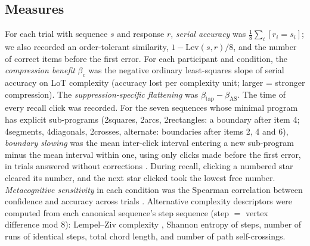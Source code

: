 \documentclass[11pt,a4paper]{article}
\begin{document}
\subsection{Measures}
For each trial with sequence $s$ and response $r$, \emph{serial accuracy} was $\frac{1}{8}\sum_{i} [r_i = s_i]$; we also
recorded an order-tolerant similarity, $1 - \mathrm{Lev}(s,r)/8$, and the number of correct items before the first error.
For each participant and condition, the \emph{compression benefit} $\beta_c$ was the negative ordinary least-squares slope of
serial accuracy on LoT complexity (accuracy lost per complexity unit; larger = stronger compression). The
\emph{suppression-specific flattening} was $\beta_{\text{tap}} - \beta_{\text{AS}}$. The time of every recall click was recorded. For the seven sequences whose minimal program has explicit sub-programs
(2squares, 2arcs, 2rectangles: a boundary after item 4; 4segments, 4diagonals, 2crosses, alternate: boundaries after items 2,
4 and 6), \emph{boundary slowing} was the mean inter-click interval entering a new sub-program minus the mean interval within
one, using only clicks made before the first error, in trials answered without corrections \citep{tabbane2026humans}.
During recall, clicking a numbered star cleared its number, and the next star clicked took the lowest free number. \emph{Metacognitive sensitivity} in each
condition was the Spearman correlation between confidence and accuracy across trials \citep[cf.][]{fleming2014measure}.
Alternative complexity descriptors were computed from each canonical sequence's step sequence (step $=$ vertex difference
mod 8): Lempel--Ziv complexity \citep{lempel1976complexity}, Shannon entropy of steps, number of runs of identical steps, total
chord length, and number of path self-crossings.
\end{document}
